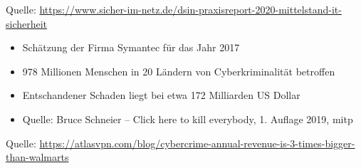 \begin{frame}
\begin{center}

\end{center}
\scriptsize Quelle: \href{https://www.sicher-im-netz.de/dsin-praxisreport-2020-mittelstand-it-sicherheit}{https://www.sicher-im-netz.de/dsin-praxisreport-2020-mittelstand-it-sicherheit}
\end{frame}


\begin{frame}
\begin{itemize}
  \item Schätzung der Firma Symantec für das Jahr 2017
  \item 978 Millionen Menschen in 20 Ländern von Cyberkriminalität betroffen
  \item Entschandener Schaden liegt bei etwa 172 Milliarden US Dollar
  \item Quelle: Bruce Schneier -- Click here to kill everybody, 1. Auflage 2019, mitp
\end{itemize}
\end{frame}


\begin{frame}
\begin{center}


\scriptsize Quelle: \href{https://atlasvpn.com/blog/cybercrime-annual-revenue-is-3-times-bigger-than-walmarts}{https://atlasvpn.com/blog/cybercrime-annual-revenue-is-3-times-bigger-than-walmarts}
\end{center}
\end{frame}

